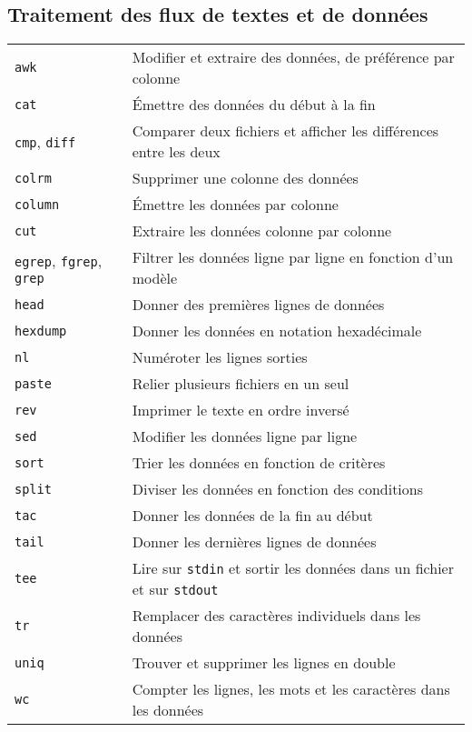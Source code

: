 \documentclass[10pt,a4paper]{article}
\begin{document}
\begin{multicols}{2}
\section{Traitement des flux de textes et de données}
\begin{tabular}{ p{2.5cm} p{8.5cm} }
  \hline
  \texttt{awk} & Modifier et extraire des données, de préférence par colonne \\
  \rowcolor{Gray}
  \texttt{cat} & Émettre des données du début à la fin\\
  \texttt{cmp}, \texttt{diff} & Comparer deux fichiers et afficher les différences entre les deux\\
  \rowcolor{Gray}
  \texttt{colrm} & Supprimer une colonne des données \\
  \texttt{column} & Émettre les données par colonne \\
  \rowcolor{Gray}
  \texttt{cut} &  Extraire les données colonne par colonne\\
  \texttt{egrep}, \texttt{fgrep}, \texttt{grep} & Filtrer les données ligne par ligne en fonction d'un modèle\\
  \rowcolor{Gray}
  \texttt{head} & Donner des premières lignes de données\\
  \texttt{hexdump} & Donner les données en notation hexadécimale\\
  \rowcolor{Gray}
  \texttt{nl} & Numéroter les lignes sorties \\
  \texttt{paste} & Relier plusieurs fichiers en un seul \\
  \rowcolor{Gray}
  \texttt{rev} & Imprimer le texte en ordre inversé \\
  \texttt{sed} & Modifier les données ligne par ligne \\
  \rowcolor{Gray}
  \texttt{sort} & Trier les données en fonction de critères\\
  \texttt{split} & Diviser les données en fonction des conditions \\
  \rowcolor{Gray}
  \texttt{tac} & Donner les données de la fin au début\\
  \texttt{tail} & Donner les dernières lignes de données\\
  \rowcolor{Gray}
  \texttt{tee} & Lire sur \texttt{stdin} et sortir les données dans un fichier et sur \texttt{stdout}\\
  \texttt{tr} & Remplacer des caractères individuels dans les données\\
  \rowcolor{Gray}
  \texttt{uniq} & Trouver et supprimer les lignes en double \\
  \texttt{wc} & Compter les lignes, les mots et les caractères dans les données\\
  \hline
\end{tabular}

\end{multicols}
\end{document}
